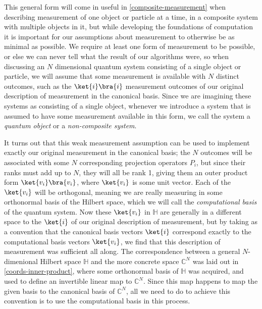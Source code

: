 This general form will come in useful in \autoref{composite-measurement} when describing measurement of one object or particle at a time, in a composite system with multiple objects in it, but while developing the foundations of computation it is important for our assumptions about measurement to otherwise be as minimal as possible. We require at least one form of measurement to be possible, or else we can never tell what the result of our algorithms were, so when discussing an $N$ dimensional quantum system consisting of a single object or particle, we will assume that some measurement is available with $N$ distinct outcomes, such as the $\ket{i}\bra{i}$ measurement outcomes of our original description of measurement in the canonical basis. Since we are imagining these systems as consisting of a single object, whenever we introduce a system that is assumed to have some measurement available in this form, we call the system a \emph{quantum object} or a \emph{non-composite system}.

It turns out that this weak measurement assumption can be used to implement exactly our original measurement in the canonical basis; the $N$ outcomes will be associated with some $N$ corresponding projection operators $P_i$, but since their ranks must add up to $N$, they will all be rank 1, giving them an outer product form $\ket{v_i}\bra{v_i}$, where $\ket{v_i}$ is some unit vector. Each of the $\ket{v_i}$ will be orthogonal, meaning we are really measuring in some orthonormal basis of the Hilbert space, which we will call the \emph{computational basis} of the quantum system. Now these $\ket{v_i}$ in $\mathbb{H}$ are generally in a different space to the $\ket{i}$ of our original description of measurement, but by taking as a convention that the canonical basis vectors $\ket{i}$ correspond exactly to the computational basis vectors $\ket{v_i}$, we find that this description of measurement was sufficient all along. The correspondence between a general $N$-dimenional Hilbert space $\mathbb{H}$ and the more concrete space $\mathbb{C}^N$ was laid out in \autoref{coords-inner-product}, where some orthonormal basis of $\mathbb{H}$ was acquired, and used to define an invertible linear map to $\mathbb{C}^N$. Since this map happens to map the given basis to the canonical basis of $\mathbb{C}^N$, all we need to do to achieve this convention is to use the computational basis in this process.
